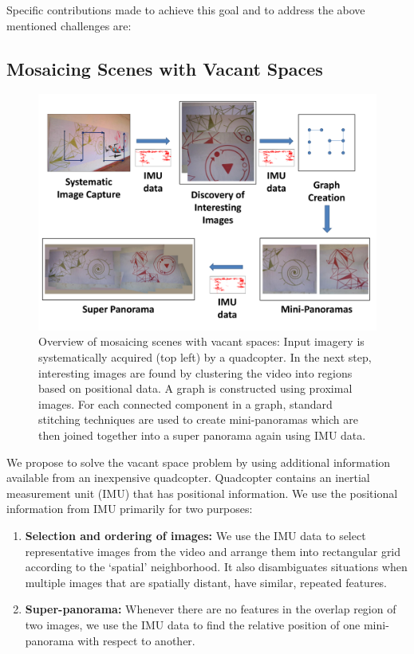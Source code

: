 Specific contributions made to achieve this goal and to address the above
mentioned challenges are:\\

\subsection{Mosaicing Scenes with Vacant Spaces}
\begin{figure}[h!]
	\centering
	\includegraphics[width=0.98\linewidth]{figures/vacantSpaces/Workflow}
	\caption[Workflow]{ Overview of mosaicing scenes with vacant spaces: Input
	imagery is systematically acquired (top left) by a quadcopter.  In the next
    step, interesting images are found by clustering the video into
    regions based on positional data.  A graph is constructed using
    proximal images. For each connected component in a graph, standard
    stitching techniques are used to create mini-panoramas which are
    then joined together into a super panorama 
    again using IMU data.}
    \label{fig:vaccantSpaces_workflow} 
  \end{figure}
  
  We propose to solve the vacant space problem by using additional information
  available from an inexpensive quadcopter. Quadcopter contains an inertial
measurement unit (IMU) that has positional information. We use the positional
information from IMU primarily for two purposes:
\begin{enumerate}
\item \textbf{Selection and ordering of images:}
We use the IMU data to select representative images from the video and arrange
them into rectangular grid according to the `spatial' neighborhood. It also
  disambiguates situations when multiple images that are spatially distant,
  have similar, repeated features.

\item \textbf{Super-panorama:} Whenever there are no features in
  the overlap region of two images, we use the IMU data to find the
  relative position of one mini-panorama with respect to another.
\end{enumerate}

